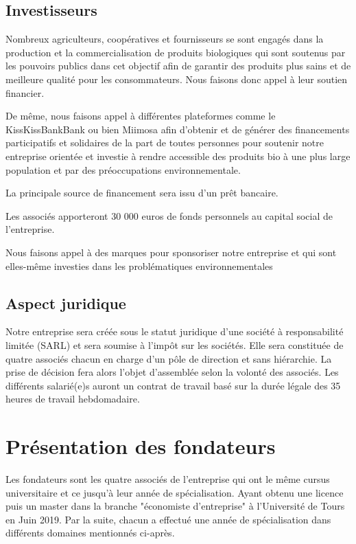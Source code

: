\documentclass[12pt,a4paper]{report}
\begin{document}
		\section{Investisseurs}
		
		Nombreux agriculteurs, coopératives et fournisseurs se sont engagés dans la production et la commercialisation de produits biologiques qui sont soutenus par les pouvoirs publics dans cet objectif afin de garantir des produits plus sains et de meilleure qualité pour les consommateurs. Nous faisons donc appel à leur soutien financier.
		
		De même, nous faisons appel à différentes plateformes comme le KissKissBankBank ou bien Miimosa afin d'obtenir et de générer des financements participatifs et solidaires de la part de toutes personnes pour soutenir notre entreprise orientée et investie à rendre accessible des produits bio à une plus large population et par des préoccupations environnementale.
		
		La principale source de financement sera issu d'un prêt bancaire.
		
		Les associés apporteront 30 000 euros de fonds personnels au capital social de l'entreprise.
		
		Nous faisons appel à des marques pour sponsoriser notre entreprise et qui sont elles-même investies dans les problématiques environnementales
		
		
		\section{Aspect juridique}
		Notre entreprise sera créée sous le statut juridique d'une société à responsabilité limitée (SARL) et sera soumise à l'impôt sur les sociétés. Elle sera constituée de quatre associés chacun en charge d'un pôle de direction et sans hiérarchie. La prise de décision fera alors l'objet d'assemblée selon la volonté des associés. Les différents salarié(e)s auront un contrat de travail basé sur la durée légale des 35 heures de travail hebdomadaire.
		
		
	\chapter{Présentation des fondateurs}
	
	Les fondateurs sont les quatre associés de l'entreprise qui ont le même cursus universitaire et ce jusqu'à leur année de spécialisation. Ayant obtenu une licence puis un master dans la branche "économiste d'entreprise" à l'Université de Tours en Juin 2019. Par la suite, chacun a effectué une année de spécialisation dans différents domaines mentionnés ci-après.
\end{document}
